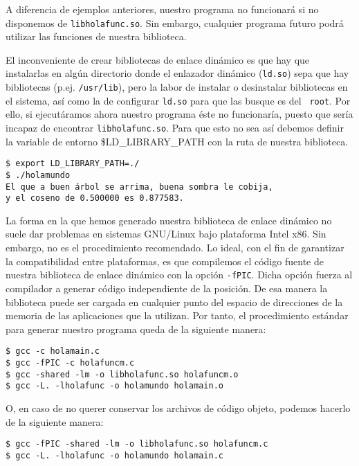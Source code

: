 A diferencia de ejemplos anteriores, nuestro programa no funcionará si
no disponemos de {\tt libholafunc.so}. Sin embargo, cualquier programa
futuro podrá utilizar las funciones de nuestra biblioteca.

El inconveniente de crear bibliotecas de enlace dinámico es que hay
que instalarlas en algún directorio donde el enlazador dinámico
({\tt ld.so}) sepa que hay bibliotecas (p.ej. {\tt /usr/lib}), pero
la labor de instalar o desinstalar bibliotecas en el sistema, así
como la de configurar {\tt ld.so} para que las busque es del {\tt
root}. Por ello, si ejecutáramos ahora nuestro programa éste no
funcionaría, puesto que sería incapaz de encontrar {\tt libholafunc.so}.
Para que esto no sea así debemos definir la variable de entorno
\$LD\_LIBRARY\_PATH con la ruta de nuestra
biblioteca.

\begin{verbatim}
$ export LD_LIBRARY_PATH=./
$ ./holamundo
El que a buen árbol se arrima, buena sombra le cobija,
y el coseno de 0.500000 es 0.877583.
\end{verbatim}

La forma en la que hemos generado nuestra biblioteca de enlace dinámico
no suele dar problemas en sistemas GNU/Linux bajo plataforma Intel x86.
Sin embargo, no es el procedimiento recomendado. Lo ideal, con el fin
de garantizar la compatibilidad entre plataformas, es que compilemos
el código fuente de nuestra biblioteca de enlace dinámico con la
opción {\tt -fPIC}. Dicha opción fuerza al compilador a generar código
independiente de la posición. De esa manera la biblioteca puede ser
cargada en cualquier punto del espacio de direcciones de la memoria de
las aplicaciones que la utilizan. Por tanto, el procedimiento estándar
para generar nuestro programa queda de la siguiente manera:

\begin{verbatim}
$ gcc -c holamain.c
$ gcc -fPIC -c holafuncm.c
$ gcc -shared -lm -o libholafunc.so holafuncm.o
$ gcc -L. -lholafunc -o holamundo holamain.o
\end{verbatim}

O, en caso de no querer conservar los archivos de código objeto, podemos
hacerlo de la siguiente manera:

\begin{verbatim}
$ gcc -fPIC -shared -lm -o libholafunc.so holafuncm.c
$ gcc -L. -lholafunc -o holamundo holamain.c
\end{verbatim}

